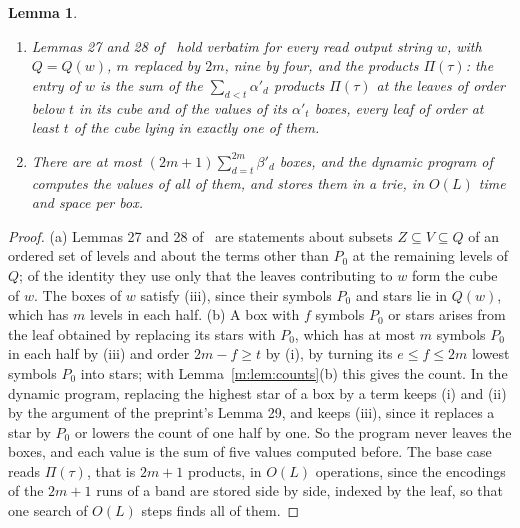 \documentclass[11pt]{article}
\newtheorem{lemma}[theorem]{Lemma}
\theoremstyle{definition}
\theoremstyle{remark}
\begin{document}
\begin{lemma}\label{m:lem:boxes}
\begin{enumerate}[label=(\alph*),nosep]
\item Lemmas 27 and 28 of~\cite{ZT} hold verbatim for every read output string $w$, with $Q=Q(w)$, $m$ replaced by $2m$, nine by four, and the products $\Pi(\tau)$: the entry of $w$ is the sum of the $\sum_{d<t}\alpha'_d$ products $\Pi(\tau)$ at the leaves of order below $t$ in its cube and of the values of its $\alpha'_t$ boxes, every leaf of order at least $t$ of the cube lying in exactly one of them.
\item There are at most $(2m+1)\sum_{d=t}^{2m}\beta'_d$ boxes, and the dynamic program of~\cite[Lemma 29]{ZT} computes the values of all of them, and stores them in a trie, in $O(L)$ time and space per box.
\end{enumerate}
\end{lemma}

\begin{proof}
(a) Lemmas 27 and 28 of~\cite{ZT} are statements about subsets $Z\subseteq V\subseteq Q$ of an ordered set of levels and about the terms other than $P_0$ at the remaining levels of $Q$; of the identity they use only that the leaves contributing to $w$ form the cube of $w$. The boxes of $w$ satisfy (iii), since their symbols $P_0$ and stars lie in $Q(w)$, which has $m$ levels in each half. (b) A box with $f$ symbols $P_0$ or stars arises from the leaf obtained by replacing its stars with $P_0$, which has at most $m$ symbols $P_0$ in each half by (iii) and order $2m-f\ge t$ by (i), by turning its $e\le f\le2m$ lowest symbols $P_0$ into stars; with Lemma~\ref{m:lem:counts}(b) this gives the count. In the dynamic program, replacing the highest star of a box by a term keeps (i) and (ii) by the argument of the preprint's Lemma 29, and keeps (iii), since it replaces a star by $P_0$ or lowers the count of one half by one. So the program never leaves the boxes, and each value is the sum of five values computed before. The base case reads $\Pi(\tau)$, that is $2m+1$ products, in $O(L)$ operations, since the encodings of the $2m+1$ runs of a band are stored side by side, indexed by the leaf, so that one search of $O(L)$ steps finds all of them.
\end{proof}
\end{document}
